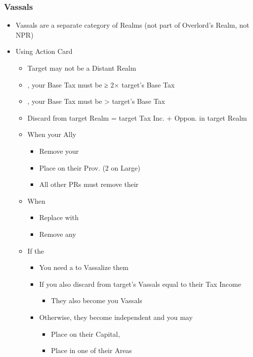 \documentclass[10pt]{article}
\begin{document}
\subsubsection*{Vassals }
\begin{itemize}
	\item Vassals are a separate category of Realms (not part of Overlord's Realm, not NPR)
	\item Using  Action Card
	\begin{itemize}
		\item Target may not be a Distant Realm
		\item {}, your Base Tax must be ≥ 2× target's Base Tax
		\item {}, your Base Tax must be > target's Base Tax
		\item Discard \influence from target Realm = target Tax Inc. + Oppon. \influence in target Realm
		\item When  your Ally
		\begin{itemize}
			\item Remove your \alliance
			\item Place \vassals on their Prov. (2 on Large)
			\item All other PRs must remove their \marriages
		\end{itemize}
		\item When 
		\begin{itemize}
			\item Replace \vassals with \towns
			\item Remove any \marriage
		\end{itemize}
		\item If the 
		\begin{itemize}
			\item You need a \marriage to Vassalize them
			\item If you also discard \influence from target's Vassals equal to their Tax Income
			\begin{itemize}
				\item They also become you Vassals
			\end{itemize}
			\item Otherwise, they become independent and you may
			\begin{itemize}
				\item Place \alliance on their Capital, 
				\item Place \claim in one of their Areas

\end{itemize}
\end{itemize}
\end{itemize}
\end{itemize}
\end{document}
